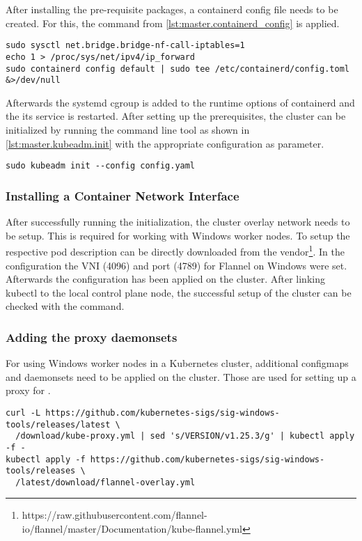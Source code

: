 After installing the pre-requisite packages, a containerd config file needs to be created. For this, the command from \autoref{lst:master.containerd_config} is applied.
\begin{lstlisting}[label=lst:master.containerd_config, caption={Bash command for setting up containerd config}]
sudo sysctl net.bridge.bridge-nf-call-iptables=1
echo 1 > /proc/sys/net/ipv4/ip_forward
sudo containerd config default | sudo tee /etc/containerd/config.toml &>/dev/null
\end{lstlisting}
Afterwards the systemd \ac{cgroup} is added to the runtime options of containerd and the its service is restarted.
After setting up the prerequisites, the cluster can be initialized by running the command line tool as shown in \autoref{lst:master.kubeadm.init} with the appropriate configuration as parameter.
\begin{lstlisting}[label=lst:master.kubeadm.init, caption={Bash command for setting up the cluster}]
sudo kubeadm init --config config.yaml
\end{lstlisting}

\subsubsection{Installing a Container Network Interface}
After successfully running the initialization, the cluster overlay network  needs to be setup.
This is required for working with Windows worker nodes.  To setup  the respective pod description can be directly downloaded from the vendor\footnote{https://raw.githubusercontent.com/flannel-io/flannel/master/Documentation/kube-flannel.yml}. In the configuration the VNI (4096) and port (4789) for Flannel on Windows were set. Afterwards the configuration has been applied on the cluster.
After linking kubectl to the local control plane node, the successful setup of the cluster can be checked with the  command.


\subsubsection{Adding the proxy daemonsets}
For using Windows worker nodes in a Kubernetes cluster, additional configmaps and daemonsets need to be applied on the cluster. Those are used for setting up a proxy for .
\begin{lstlisting}
curl -L https://github.com/kubernetes-sigs/sig-windows-tools/releases/latest \
  /download/kube-proxy.yml | sed 's/VERSION/v1.25.3/g' | kubectl apply -f -
kubectl apply -f https://github.com/kubernetes-sigs/sig-windows-tools/releases \
  /latest/download/flannel-overlay.yml
\end{lstlisting}

